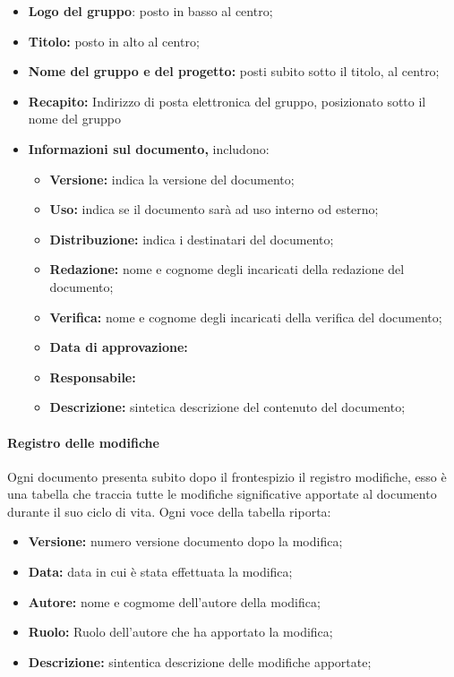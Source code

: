 \begin{itemize}

	\item \textbf{Logo del gruppo}: posto in basso al centro;
	\item \textbf{Titolo:} posto in alto al centro;
	\item \textbf{Nome del gruppo e del progetto:} posti subito sotto il titolo, al centro;
	\item \textbf{Recapito:} Indirizzo di posta elettronica del gruppo, posizionato sotto il nome del gruppo
	\item \textbf{Informazioni sul documento,} includono:
	
	\begin{itemize}
		\item \textbf{Versione:} indica la versione del documento;
		\item \textbf{Uso:} indica se il documento sarà ad uso interno od esterno;
		\item \textbf{Distribuzione:} indica i destinatari del documento;
		\item \textbf{Redazione:} nome e cognome degli incaricati della redazione del documento;
		\item \textbf{Verifica:} nome e cognome degli incaricati della verifica del documento;
		\item \textbf{Data di approvazione:}
		\item \textbf{Responsabile:}
		\item \textbf{Descrizione:} sintetica descrizione del contenuto del documento;
	\end{itemize}

\end{itemize}

\paragraph{Registro delle modifiche}      

Ogni documento presenta subito dopo il frontespizio il registro modifiche, esso è una tabella che traccia tutte le modifiche significative apportate al documento durante il suo ciclo di vita. Ogni voce della tabella riporta:

\begin{itemize}
	\item \textbf{Versione:} numero versione documento dopo la modifica;
	\item \textbf{Data:} data in cui è stata effettuata la modifica;
	\item \textbf{Autore:} nome e cogmome dell'autore della modifica;
	\item \textbf{Ruolo:} Ruolo dell'autore che ha apportato la modifica;
	\item \textbf{Descrizione:} sintentica descrizione delle modifiche apportate;
\end{itemize}

